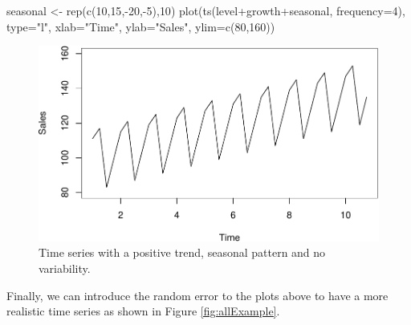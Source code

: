 \documentclass[
]{book}
\newenvironment{Shaded}{\begin{snugshade}}{\end{snugshade}}
\newcommand{\AttributeTok}[1]{\textcolor[rgb]{0.77,0.63,0.00}{#1}}
\newcommand{\DecValTok}[1]{\textcolor[rgb]{0.00,0.00,0.81}{#1}}
\newcommand{\FunctionTok}[1]{\textcolor[rgb]{0.00,0.00,0.00}{#1}}
\newcommand{\NormalTok}[1]{#1}
\newcommand{\OtherTok}[1]{\textcolor[rgb]{0.56,0.35,0.01}{#1}}
\newcommand{\SpecialCharTok}[1]{\textcolor[rgb]{0.00,0.00,0.00}{#1}}
\newcommand{\StringTok}[1]{\textcolor[rgb]{0.31,0.60,0.02}{#1}}
\theoremstyle{definition}
\theoremstyle{definition}
\theoremstyle{definition}
\theoremstyle{definition}
\theoremstyle{remark}
\begin{document}
\begin{Shaded}
\begin{Highlighting}[]
\NormalTok{seasonal }\OtherTok{\textless{}{-}} \FunctionTok{rep}\NormalTok{(}\FunctionTok{c}\NormalTok{(}\DecValTok{10}\NormalTok{,}\DecValTok{15}\NormalTok{,}\SpecialCharTok{{-}}\DecValTok{20}\NormalTok{,}\SpecialCharTok{{-}}\DecValTok{5}\NormalTok{),}\DecValTok{10}\NormalTok{)}
\FunctionTok{plot}\NormalTok{(}\FunctionTok{ts}\NormalTok{(level}\SpecialCharTok{+}\NormalTok{growth}\SpecialCharTok{+}\NormalTok{seasonal, }\AttributeTok{frequency=}\DecValTok{4}\NormalTok{),}
     \AttributeTok{type=}\StringTok{"l"}\NormalTok{, }\AttributeTok{xlab=}\StringTok{"Time"}\NormalTok{, }\AttributeTok{ylab=}\StringTok{"Sales"}\NormalTok{, }\AttributeTok{ylim=}\FunctionTok{c}\NormalTok{(}\DecValTok{80}\NormalTok{,}\DecValTok{160}\NormalTok{))}
\end{Highlighting}
\end{Shaded}

\begin{figure}
\centering
\includegraphics{Svetunkov--2022----ADAM_files/figure-latex/seasonalExample-1.pdf}
\caption{\label{fig:seasonalExample}Time series with a positive trend, seasonal pattern and no variability.}
\end{figure}

Finally, we can introduce the random error to the plots above to have a more realistic time series as shown in Figure \ref{fig:allExample}.
\end{document}
